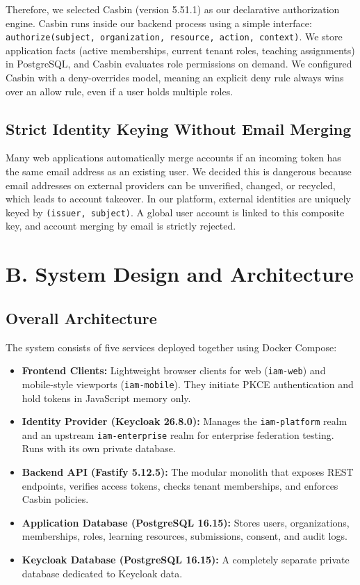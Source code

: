 \documentclass{article}
\begin{document}
Therefore, we selected Casbin (version 5.51.1) as our declarative authorization engine. Casbin runs inside our backend process using a simple interface: \texttt{authorize(subject, organization, resource, action, context)}. We store application facts (active memberships, current tenant roles, teaching assignments) in PostgreSQL, and Casbin evaluates role permissions on demand. We configured Casbin with a deny-overrides model, meaning an explicit deny rule always wins over an allow rule, even if a user holds multiple roles.

\subsection*{Strict Identity Keying Without Email Merging}
Many web applications automatically merge accounts if an incoming token has the same email address as an existing user. We decided this is dangerous because email addresses on external providers can be unverified, changed, or recycled, which leads to account takeover. In our platform, external identities are uniquely keyed by \texttt{(issuer, subject)}. A global user account is linked to this composite key, and account merging by email is strictly rejected.

\section*{B. System Design and Architecture}
\subsection*{Overall Architecture}
The system consists of five services deployed together using Docker Compose:
\begin{itemize}
    \item \textbf{Frontend Clients:} Lightweight browser clients for web (\texttt{iam-web}) and mobile-style viewports (\texttt{iam-mobile}). They initiate PKCE authentication and hold tokens in JavaScript memory only.
    \item \textbf{Identity Provider (Keycloak 26.8.0):} Manages the \texttt{iam-platform} realm and an upstream \texttt{iam-enterprise} realm for enterprise federation testing. Runs with its own private database.
    \item \textbf{Backend API (Fastify 5.12.5):} The modular monolith that exposes REST endpoints, verifies access tokens, checks tenant memberships, and enforces Casbin policies.
    \item \textbf{Application Database (PostgreSQL 16.15):} Stores users, organizations, memberships, roles, learning resources, submissions, consent, and audit logs.
    \item \textbf{Keycloak Database (PostgreSQL 16.15):} A completely separate private database dedicated to Keycloak data.
\end{itemize}
\end{document}
